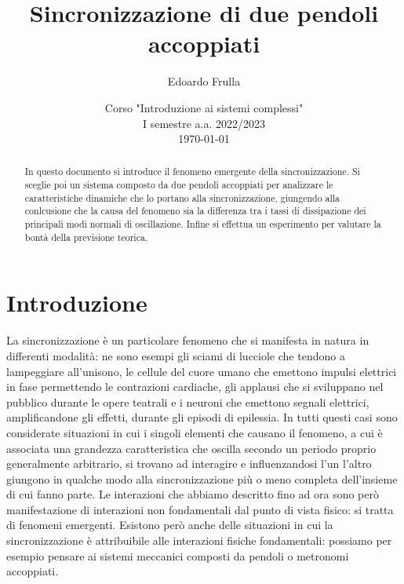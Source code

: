 \documentclass[11pt, a4paper, twoside, italian]{article}
\author{Edoardo Frulla}
\date{Corso "Introduzione ai sistemi complessi" \\ \vspace{0.3cm} I semestre a.a. 2022/2023 \\ \vspace{0.3cm} \today}
\title{Sincronizzazione di due pendoli accoppiati}
\begin{document}
\maketitle
    \begin{abstract}
        In questo documento si introduce il fenomeno emergente della sincronizzazione.
        Si sceglie poi un sistema composto da due pendoli accoppiati per analizzare le caratteristiche
        dinamiche che lo portano alla sincronizzazione, giungendo alla conlcusione che
        la causa del fenomeno sia la differenza tra i tassi di dissipazione dei principali
        modi normali di oscillazione.
        Infine si effettua un esperimento per valutare la bontà della previsione teorica.
    \end{abstract}

\section{Introduzione}
La sincronizzazione è un particolare fenomeno che si manifesta in natura in differenti modalità: ne sono esempi gli sciami di lucciole che tendono a lampeggiare all'unisono, le cellule del cuore umano che emettono impulsi elettrici in fase permettendo le contrazioni cardiache, gli applausi che si sviluppano nel pubblico durante le opere teatrali e i neuroni che emettono segnali elettrici, amplificandone gli effetti, durante gli episodi di epilessia.
In tutti questi casi sono considerate situazioni in cui i singoli elementi che causano il fenomeno, a cui è associata una grandezza caratteristica che oscilla secondo un periodo proprio generalmente arbitrario, si trovano ad interagire e influenzandosi l'un l'altro giungono in qualche modo alla sincronizzazione più o meno completa dell'insieme di cui fanno parte.
Le interazioni che abbiamo descritto fino ad ora sono però manifestazione di interazioni non fondamentali dal punto di vista fisico: si tratta di fenomeni emergenti. 
Esistono però anche delle situazioni in cui la sincronizzazione è attribuibile alle interazioni fisiche fondamentali: possiamo per esempio pensare ai sistemi meccanici composti da pendoli o metronomi accoppiati.
\end{document}
